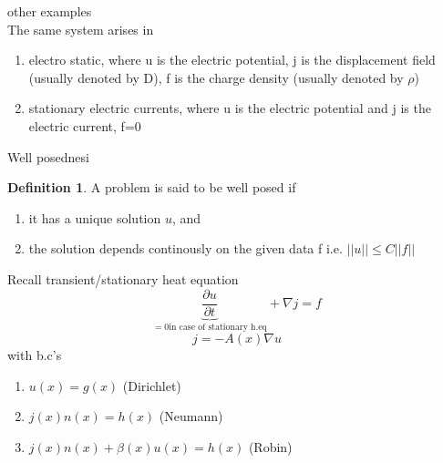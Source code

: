 \documentclass[ngerman]{article}
\theoremstyle{definition}
\newtheorem*{defi}{Definition}
\theoremstyle{remark}
\newcommand{\f}[2]{\frac{#1}{#2}}							%
\newcommand{\p}{\partial}
\newcommand{\bb}{\beta}					%
\newcommand{\tx}[1]{\text{#1}}
\begin{document}
other examples\\
The same system arises in 
\begin{enumerate}
\item electro static, where u is the electric potential, j is the displacement field (usually denoted by D), f is the charge density (usually denoted by $\rho$)
\item stationary electric currents, where u is the electric potential and j is the electric current, f=0
\end{enumerate}
Well posednesi\\
\begin{defi} A problem is said to be well posed if 
  \begin{enumerate}
  \item it has a unique solution $u$, and
  \item the solution depends continously on the given data f i.e. $||u||\leq C ||f||$
  \end{enumerate}
\end{defi}
Recall transient/stationary heat equation
$$\underbrace{\f{\p u}{\p t}}_{=0 \tx{in case of stationary h.eq}}+ \nabla j = f$$
$$j= -A(x)\nabla u$$
with b.c's
\begin{enumerate}
\item $u(x) = g(x)$ (Dirichlet)
\item $j(x) n(x) = h(x) $ (Neumann)
\item $j(x)n(x) + \bb (x) u(x) = h(x) $ (Robin)
\end{enumerate}
\end{document}
